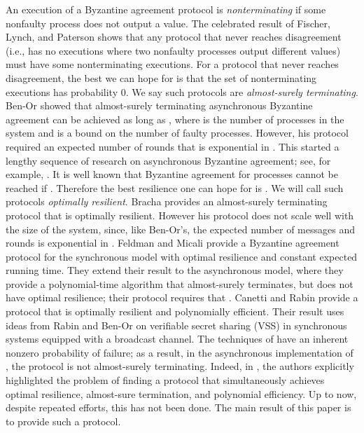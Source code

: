 \documentclass{sig-alternate}
\begin{document}
An execution of a Byzantine agreement protocol is
\emph{nonterminating} if some nonfaulty process 
does not output a value.
The celebrated result of Fischer, Lynch, and Paterson \citeyear{FLP}
shows that any protocol that never reaches disagreement
(i.e., has no executions where two nonfaulty processes output different
values)
must have
some nonterminating executions.
For a protocol that never reaches disagreement, the best we can hope for
is that the set of 
nonterminating executions has probability 0.
We say such protocols are  \emph{almost-surely terminating}.
Ben-Or \citeyear{Ben83} showed that almost-surely terminating asynchronous
Byzantine agreement can be achieved
as long as ,
where  is the number of processes in the system and  is a bound on
the number of faulty processes.  However, his protocol required an
expected number of rounds that is exponential in .
This started a lengthy sequence of research on asynchronous Byzantine
agreement; see, for example,
\cite{Ben83,Bra84,CR93,FM88,KK06,RB89}.
It is well known that Byzantine agreement for  processes cannot be
reached if  \cite{PSL80}.
Therefore the best resilience one can hope for is . We
will call such protocols \emph{optimally resilient}.
Bracha \citeyear{Bra84}
provides an almost-surely terminating protocol that is optimally
resilient.
However his
protocol does not scale well with the size of the system, since,
like Ben-Or's, the
expected number of messages and rounds is exponential in .
Feldman and Micali \citeyear{FM88}
provide a Byzantine agreement protocol for the synchronous model with
optimal resilience and constant expected running time.
They extend their result to the asynchronous model,
where they provide a
polynomial-time algorithm that almost-surely terminates, but
does not have optimal resilience; their protocol requires that .
Canetti and Rabin \cite{CR93,CR93-long} provide a protocol that is
optimally resilient  and polynomially efficient.
Their result uses ideas from Rabin and Ben-Or \citeyear{RB89} on
verifiable secret sharing (VSS) in synchronous systems equipped with a
broadcast channel. The techniques of \cite{RB89} have an inherent
nonzero probability of failure; as a result, in the asynchronous
implementation of \cite{CR93},
the protocol is not  almost-surely terminating.
Indeed, in \cite{CR93-long}, the authors explicitly highlighted the problem
of finding a protocol that
simultaneously achieves optimal resilience, almost-sure termination, and
polynomial efficiency.
Up to now, despite repeated efforts, this has not been done.
The main result of this paper is to provide such a protocol.
\end{document}
